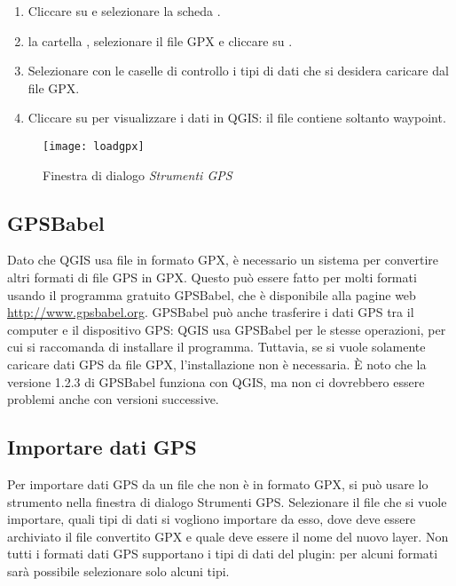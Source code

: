 \begin{enumerate}
\item Cliccare su  e selezionare la scheda .
\item {} la cartella ,
selezionare il file GPX  e cliccare su .
\item Selezionare con le caselle di controllo i tipi di dati che si desidera caricare dal file GPX.
\item Cliccare su  per visualizzare i dati in QGIS: il file  
contiene soltanto waypoint.
\end{enumerate}

\begin{figure}[ht]
   \centering
   \texttt{[image: loadgpx]}
   \caption{Finestra di dialogo \emph{Strumenti GPS} \nixcaption}\label{gpxloader}
\end{figure}

\subsection{GPSBabel}

Dato che QGIS usa file in formato GPX, è necessario un sistema per convertire altri formati di file GPS in GPX.
Questo può essere fatto per molti formati usando il programma gratuito GPSBabel, che è disponibile alla
pagine web \url{http://www.gpsbabel.org}.
GPSBabel può anche trasferire i dati GPS tra il computer e il dispositivo GPS: QGIS usa GPSBabel per le stesse 
operazioni, per cui si raccomanda di installare il programma. Tuttavia, se si vuole solamente caricare dati GPS 
da file GPX, l'installazione non è necessaria.
È noto che la versione 1.2.3 di GPSBabel funziona con QGIS, ma non ci dovrebbero essere problemi anche con 
versioni successive.

\subsection{Importare dati GPS}

Per importare dati GPS da un file che non è in formato GPX, si può usare lo strumento  
nella finestra di dialogo Strumenti GPS.
Selezionare il file che si vuole importare, quali tipi di dati si vogliono importare da esso, dove deve essere 
archiviato il file convertito GPX e quale deve essere il nome del nuovo layer. Non tutti i formati dati GPS supportano 
i tipi di dati del plugin: per alcuni formati sarà possibile selezionare solo alcuni tipi.

